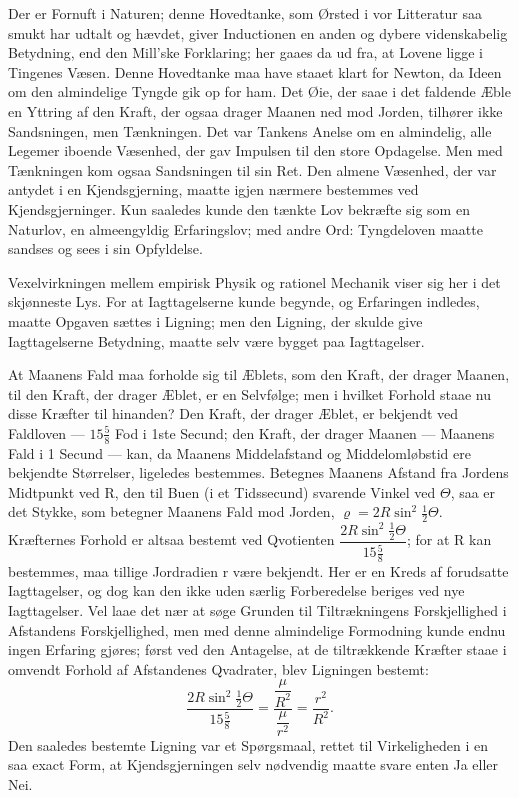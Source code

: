 \documentclass[12pt,a4paper]{book}
\begin{document}
Der er Fornuft i Naturen; denne Hovedtanke, som Ørsted i
vor Litteratur saa smukt har udtalt og hævdet, giver Inductionen
en anden og dybere videnskabelig Betydning, end den Mill'ske
Forklaring; her gaaes da ud fra, at Lovene ligge i Tingenes
Væsen. Denne Hovedtanke maa have staaet klart for Newton,
da Ideen om den almindelige Tyngde gik op for ham. Det Øie,
der saae i det faldende Æble en Yttring af den Kraft, der ogsaa
drager Maanen ned mod Jorden, tilhører ikke Sandsningen, men
Tænkningen. Det var Tankens Anelse om en almindelig, alle
Legemer iboende Væsenhed, der gav Impulsen til den store
Opdagelse. Men med Tænkningen kom ogsaa Sandsningen til sin
Ret. Den almene Væsenhed, der var antydet i en Kjendsgjerning,
maatte igjen nærmere bestemmes ved Kjendsgjerninger. Kun
saaledes kunde den tænkte Lov bekræfte sig som en Naturlov, en
almeengyldig Erfaringslov; med andre Ord: Tyngdeloven maatte
sandses og sees i sin Opfyldelse.

Vexelvirkningen mellem empirisk Physik og rationel Mechanik
viser sig her i det skjønneste Lys. For at Iagttagelserne kunde
begynde, og Erfaringen indledes, maatte Opgaven sættes i
Ligning; men den Ligning, der skulde give Iagttagelserne Betydning,
maatte selv være bygget paa Iagttagelser.

At Maanens Fald maa forholde sig til Æblets, som den Kraft,
der drager Maanen, til den Kraft, der drager Æblet, er en
Selvfølge; men i hvilket Forhold staae nu disse Kræfter til
hinanden? Den Kraft, der drager Æblet, er bekjendt ved
Faldloven --- $15\tfrac{5}{8}$ Fod i 1ste Secund; den Kraft, der drager
Maanen --- Maanens Fald i 1 Secund --- kan, da Maanens
Middelafstand og Middelomløbstid ere bekjendte Størrelser, ligeledes
bestemmes. Betegnes Maanens Afstand
fra Jordens Midtpunkt ved R, den til Buen (i et Tidssecund)
svarende Vinkel ved $\Theta$, saa er det Stykke, som betegner
Maanens Fald mod Jorden, $\varrho = 2 R \sin^{2} \tfrac{1}{2} \Theta$.
Kræfternes Forhold er altsaa bestemt ved Qvotienten
$\dfrac{2 R \sin^{2} \tfrac{1}{2} \Theta}{15\tfrac{5}{8}}$;
for at R kan bestemmes, maa tillige Jordradien r være bekjendt.
Her er en Kreds af forudsatte Iagttagelser, og dog kan den ikke
uden særlig Forberedelse beriges ved nye Iagttagelser. Vel laae
det nær at søge Grunden til Tiltrækningens Forskjellighed i
Afstandens Forskjellighed, men med denne almindelige Formodning
kunde endnu ingen Erfaring gjøres; først ved den Antagelse, at
de tiltrækkende Kræfter staae i omvendt Forhold af Afstandenes
Qvadrater, blev Ligningen bestemt:
\[
\frac{2 R \sin^{2} \tfrac{1}{2} \Theta}{15\tfrac{5}{8}}
  = \frac{\dfrac{\mu}{R^{2}}}{\dfrac{\mu}{r^{2}}}
  = \frac{r^{2}}{R^{2}}.
\]
Den saaledes bestemte Ligning var et Spørgsmaal, rettet til
Virkeligheden i en saa exact Form, at Kjendsgjerningen selv
nødvendig maatte svare enten Ja eller Nei.
\end{document}
